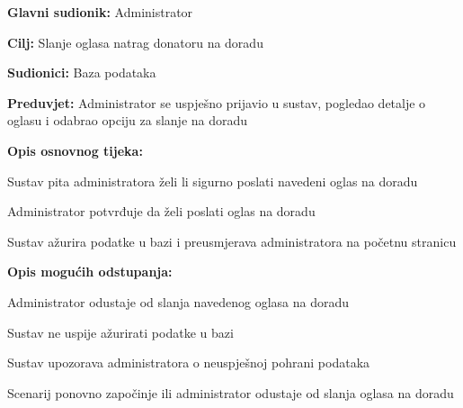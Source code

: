 					\noindent {}
					\begin{packed_item}
	
						\item \textbf{Glavni sudionik: }Administrator
						\item  \textbf{Cilj:} Slanje oglasa natrag donatoru na doradu
						\item  \textbf{Sudionici:} Baza podataka
						\item  \textbf{Preduvjet:} Administrator se uspješno prijavio u sustav, pogledao detalje o oglasu i odabrao opciju za slanje na doradu
						\item  \textbf{Opis osnovnog tijeka:}
						
						\item[] \begin{packed_enum}
							\item Sustav pita administratora želi li sigurno poslati navedeni oglas na doradu
							\item Administrator potvrđuje da želi poslati oglas na doradu
							\item Sustav ažurira podatke u bazi i preusmjerava administratora na početnu stranicu
						\end{packed_enum}

						\item  \textbf{Opis mogućih odstupanja:}

						\item[] \begin{packed_item}
							\item[2.a] Administrator odustaje od slanja navedenog oglasa na doradu
							\item[3.a] Sustav ne uspije ažurirati podatke u bazi
							\item[] \begin{packed_enum}
								\item Sustav upozorava administratora o neuspješnoj pohrani podataka
								\item Scenarij ponovno započinje ili administrator odustaje od slanja oglasa na doradu
							\end{packed_enum}					
						\end{packed_item}
					\end{packed_item}
					\eject
					\noindent {}
